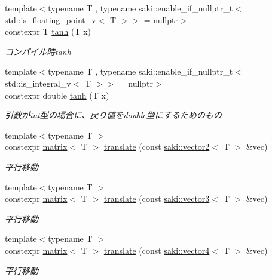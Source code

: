 \begin{DoxyCompactItemize}
{\footnotesize template$<$typename T , typename saki\+::enable\+\_\+if\+\_\+nullptr\+\_\+t$<$ std\+::is\+\_\+floating\+\_\+point\+\_\+v$<$ T $>$$>$  = nullptr$>$ }\\constexpr T \mbox{\hyperlink{namespacesaki_af2674216630169ce211f8076492ce14e}{tanh}} (T x)
\begin{DoxyCompactList}\small\item\em コンパイル時tanh \end{DoxyCompactList}\item 
{\footnotesize template$<$typename T , typename saki\+::enable\+\_\+if\+\_\+nullptr\+\_\+t$<$ std\+::is\+\_\+integral\+\_\+v$<$ T $>$$>$  = nullptr$>$ }\\constexpr double \mbox{\hyperlink{namespacesaki_a5faf83bc9a4a7e981275deba551d2f3f}{tanh}} (T x)
\begin{DoxyCompactList}\small\item\em 引数がint型の場合に、戻り値をdouble型にするためのもの \end{DoxyCompactList}\item 
{\footnotesize template$<$typename T $>$ }\\constexpr \mbox{\hyperlink{classsaki_1_1matrix}{matrix}}$<$ T $>$ \mbox{\hyperlink{namespacesaki_a2311e77a2bed9d914a6b3e8056d6023a}{translate}} (const \mbox{\hyperlink{classsaki_1_1vector2}{saki\+::vector2}}$<$ T $>$ \&vec)
\begin{DoxyCompactList}\small\item\em 平行移動 \end{DoxyCompactList}\item 
{\footnotesize template$<$typename T $>$ }\\constexpr \mbox{\hyperlink{classsaki_1_1matrix}{matrix}}$<$ T $>$ \mbox{\hyperlink{namespacesaki_a492418470fa4dedb2065e7916460f0e0}{translate}} (const \mbox{\hyperlink{classsaki_1_1vector3}{saki\+::vector3}}$<$ T $>$ \&vec)
\begin{DoxyCompactList}\small\item\em 平行移動 \end{DoxyCompactList}\item 
{\footnotesize template$<$typename T $>$ }\\constexpr \mbox{\hyperlink{classsaki_1_1matrix}{matrix}}$<$ T $>$ \mbox{\hyperlink{namespacesaki_abdd23c2e56d1500ae2e8b662c5ddcf7c}{translate}} (const \mbox{\hyperlink{classsaki_1_1vector4}{saki\+::vector4}}$<$ T $>$ \&vec)
\begin{DoxyCompactList}\small\item\em 平行移動 \end{DoxyCompactList}\item 

\end{DoxyCompactItemize}
